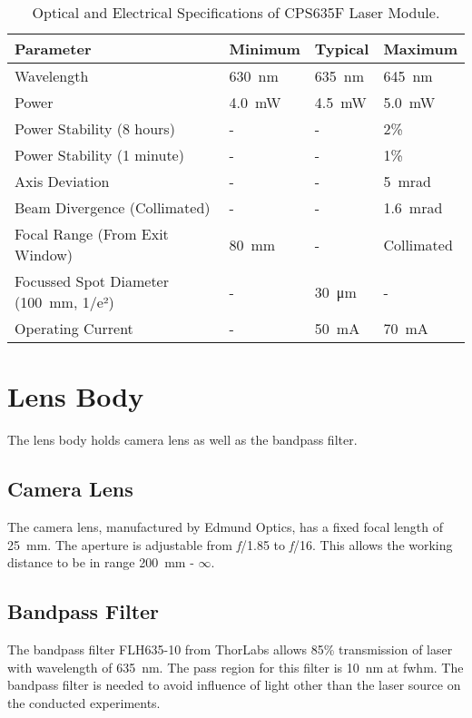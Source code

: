     \begin{table}[h]
        \centering
        \footnotesize
        \renewcommand{\arraystretch}{1.2}
        \begin{tabular}{p{6cm}p{2cm}p{2cm}p{2cm}}
            \toprule
            \textbf{Parameter} & \textbf{Minimum} & \textbf{Typical} & \textbf{Maximum} \\
            \midrule
            Wavelength & \SI{630}{\nano\meter} & \SI{635}{\nano\meter} & \SI{645}{\nano\meter} \\
            Power & \SI{4.0}{\milli\watt} & \SI{4.5}{\milli\watt} & \SI{5.0}{\milli\watt} \\
            Power Stability (8 hours) & - & - & 2\% \\
            Power Stability (1 minute) & - & - & 1\% \\
            Axis Deviation & - & - & \SI{5}{\milli\radian} \\
            Beam Divergence (Collimated) & - & - & \SI{1.6}{\milli\radian} \\
            Focal Range (From Exit Window) & \SI{80}{\milli\meter} & - & Collimated \\
            Focussed Spot Diameter (\SI{100}{\milli\meter}, 1/e²) & - & \SI{30}{\micro\meter} & - \\ 
            Operating Current & - & \SI{50}{\milli\ampere} & \SI{70}{\milli\ampere} \\
            \bottomrule
        \end{tabular}
        \caption{Optical and Electrical Specifications of CPS635F Laser Module. \cite{thorlabs_laser}}
        \label{table:laser_module_specs}
    \end{table}

\clearpage

\section*{Lens Body}
    The lens body holds camera lens as well as the bandpass filter. 
    \subsection*{Camera Lens}
    The camera lens, manufactured by Edmund Optics, has a fixed focal length of \SI{25}{\milli\meter}. The aperture is adjustable from \emph{f}/1.85 to \emph{f}/16. This allows the working distance to be in range \SI{200}{\milli\meter} - $\infty$.

    \subsection*{Bandpass Filter}
    The bandpass filter FLH635-10 from ThorLabs allows 85\% transmission of laser with wavelength of \SI{635}{\nano\meter}. The pass region for this filter is \SI{10}{\nano\meter} at \gls{fwhm}. The bandpass filter is needed to avoid influence of light other than the laser source on the conducted experiments.

